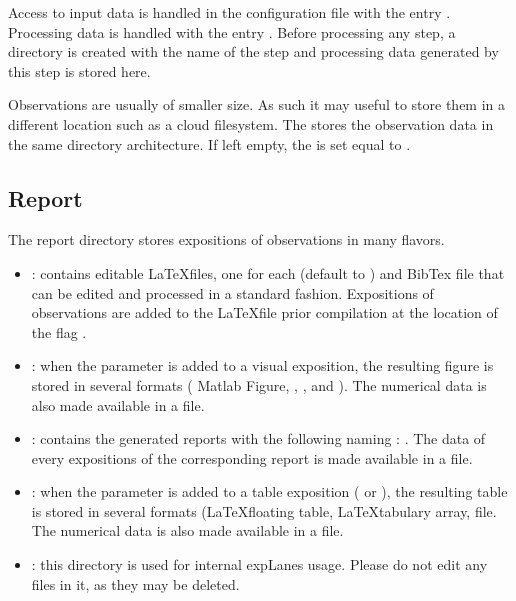 \documentclass[a4paper,fleqn]{tufte-handout}
\newcommand{\explanes}{\textsf{expLanes} }
\begin{document}
Access to input data is handled in the configuration file with the entry . Processing data is handled with the entry . Before processing any step, a directory is created with the name of the step and processing data generated by this step is stored here.

Observations are usually of smaller size. As such it may useful to store them in a different location such as a cloud filesystem. The  stores the observation data in the same directory architecture. If left empty, the  is set equal to .


\subsection{Report}

The report directory stores expositions of observations in many flavors.

\begin{itemize}
\item \textbf{}: contains editable \LaTeX files, one for each  (default to ) and BibTex file that can be edited and processed in a standard fashion. Expositions of observations are added to the \LaTeX file prior compilation at the location of the flag .
\item \textbf{}: when the  parameter is added to a visual exposition, the resulting figure is stored in several formats ( Matlab Figure, , , and ). The numerical data is also made available in a  file. 
\item \textbf{}: contains the generated reports with the following naming : . The data of every expositions of the corresponding report is made available in a  file.
\item \textbf{}:  when the  parameter is added to a table exposition ( or ), the resulting table is stored in several formats (\LaTeX floating table, \LaTeX tabulary array,  file. The numerical data is also made available in a  file.
\item \textbf{}: this directory is used for internal \explanes usage. Please do not edit any files in it, as they may be deleted.
\end{itemize}
\end{document}
